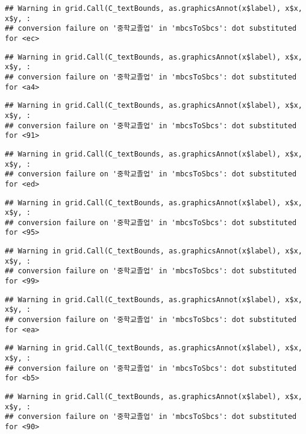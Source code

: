 \documentclass[
]{article}
\begin{document}
\begin{verbatim}
## Warning in grid.Call(C_textBounds, as.graphicsAnnot(x$label), x$x, x$y, :
## conversion failure on '중학교졸업' in 'mbcsToSbcs': dot substituted for <ec>
\end{verbatim}

\begin{verbatim}
## Warning in grid.Call(C_textBounds, as.graphicsAnnot(x$label), x$x, x$y, :
## conversion failure on '중학교졸업' in 'mbcsToSbcs': dot substituted for <a4>
\end{verbatim}

\begin{verbatim}
## Warning in grid.Call(C_textBounds, as.graphicsAnnot(x$label), x$x, x$y, :
## conversion failure on '중학교졸업' in 'mbcsToSbcs': dot substituted for <91>
\end{verbatim}

\begin{verbatim}
## Warning in grid.Call(C_textBounds, as.graphicsAnnot(x$label), x$x, x$y, :
## conversion failure on '중학교졸업' in 'mbcsToSbcs': dot substituted for <ed>
\end{verbatim}

\begin{verbatim}
## Warning in grid.Call(C_textBounds, as.graphicsAnnot(x$label), x$x, x$y, :
## conversion failure on '중학교졸업' in 'mbcsToSbcs': dot substituted for <95>
\end{verbatim}

\begin{verbatim}
## Warning in grid.Call(C_textBounds, as.graphicsAnnot(x$label), x$x, x$y, :
## conversion failure on '중학교졸업' in 'mbcsToSbcs': dot substituted for <99>
\end{verbatim}

\begin{verbatim}
## Warning in grid.Call(C_textBounds, as.graphicsAnnot(x$label), x$x, x$y, :
## conversion failure on '중학교졸업' in 'mbcsToSbcs': dot substituted for <ea>
\end{verbatim}

\begin{verbatim}
## Warning in grid.Call(C_textBounds, as.graphicsAnnot(x$label), x$x, x$y, :
## conversion failure on '중학교졸업' in 'mbcsToSbcs': dot substituted for <b5>
\end{verbatim}

\begin{verbatim}
## Warning in grid.Call(C_textBounds, as.graphicsAnnot(x$label), x$x, x$y, :
## conversion failure on '중학교졸업' in 'mbcsToSbcs': dot substituted for <90>
\end{verbatim}
\end{document}
